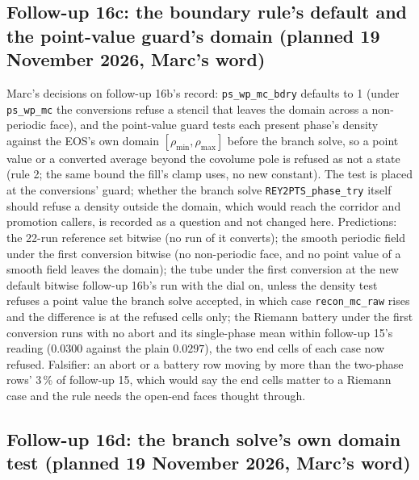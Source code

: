 \documentclass[11pt,a4paper]{article}
\newcommand{\code}[1]{\texttt{\small #1}}
\begin{document}
\subsection*{Follow-up 16c: the boundary rule's default and the point-value guard's domain (planned 19 November 2026, Marc's word)}

Marc's decisions on follow-up 16b's record: \code{ps\_wp\_mc\_bdry}
defaults to 1 (under \code{ps\_wp\_mc} the conversions refuse a stencil
that leaves the domain across a non-periodic face), and the point-value
guard tests each present phase's density against the EOS's own domain
$[\rho_{\min}, \rho_{\max}]$ before the branch solve, so a point value
or a converted average beyond the covolume pole is refused as not a
state (rule 2; the same bound the fill's clamp uses, no new constant).
The test is placed at the conversions' guard; whether the branch solve
\code{REY2PTS\_phase\_try} itself should refuse a density outside the
domain, which would reach the corridor and promotion callers, is
recorded as a question and not changed here.  Predictions: the 22-run
reference set bitwise (no run of it converts); the smooth periodic
field under the first conversion bitwise (no non-periodic face, and no
point value of a smooth field leaves the domain); the tube under the
first conversion at the new default bitwise follow-up 16b's run with
the dial on, unless the density test refuses a point value the branch
solve accepted, in which case \code{recon\_mc\_raw} rises and the
difference is at the refused cells only; the Riemann battery under the
first conversion runs with no abort and its single-phase mean within
follow-up 15's reading ($0.0300$ against the plain $0.0297$), the two
end cells of each case now refused.  Falsifier: an abort or a battery
row moving by more than the two-phase rows' 3\,\% of follow-up 15,
which would say the end cells matter to a Riemann case and the rule
needs the open-end faces thought through.

\subsection*{Follow-up 16d: the branch solve's own domain test (planned 19 November 2026, Marc's word)}
\end{document}

